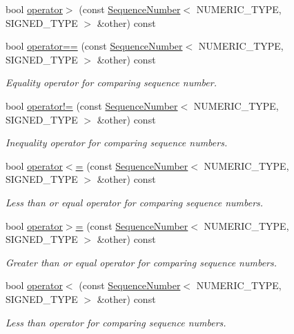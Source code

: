\begin{DoxyCompactItemize}
bool \hyperlink{classns3_1_1SequenceNumber_a455684ef50118fff5c63eba5de502c70}{operator$>$} (const \hyperlink{classns3_1_1SequenceNumber}{Sequence\+Number}$<$ N\+U\+M\+E\+R\+I\+C\+\_\+\+T\+Y\+PE, S\+I\+G\+N\+E\+D\+\_\+\+T\+Y\+PE $>$ \&other) const 
\item 
bool \hyperlink{classns3_1_1SequenceNumber_a73726697e0e122e0dbc0d9f8ede063a0}{operator==} (const \hyperlink{classns3_1_1SequenceNumber}{Sequence\+Number}$<$ N\+U\+M\+E\+R\+I\+C\+\_\+\+T\+Y\+PE, S\+I\+G\+N\+E\+D\+\_\+\+T\+Y\+PE $>$ \&other) const 
\begin{DoxyCompactList}\small\item\em Equality operator for comparing sequence number. \end{DoxyCompactList}\item 
bool \hyperlink{classns3_1_1SequenceNumber_ac2bf889d888a41f585795f9d928c5882}{operator!=} (const \hyperlink{classns3_1_1SequenceNumber}{Sequence\+Number}$<$ N\+U\+M\+E\+R\+I\+C\+\_\+\+T\+Y\+PE, S\+I\+G\+N\+E\+D\+\_\+\+T\+Y\+PE $>$ \&other) const 
\begin{DoxyCompactList}\small\item\em Inequality operator for comparing sequence numbers. \end{DoxyCompactList}\item 
bool \hyperlink{classns3_1_1SequenceNumber_aa71cb1b23fba1301d3ca429cd43a1940}{operator$<$=} (const \hyperlink{classns3_1_1SequenceNumber}{Sequence\+Number}$<$ N\+U\+M\+E\+R\+I\+C\+\_\+\+T\+Y\+PE, S\+I\+G\+N\+E\+D\+\_\+\+T\+Y\+PE $>$ \&other) const 
\begin{DoxyCompactList}\small\item\em Less than or equal operator for comparing sequence numbers. \end{DoxyCompactList}\item 
bool \hyperlink{classns3_1_1SequenceNumber_a1ee35097955e3d79bc9c65aef08d0ecb}{operator$>$=} (const \hyperlink{classns3_1_1SequenceNumber}{Sequence\+Number}$<$ N\+U\+M\+E\+R\+I\+C\+\_\+\+T\+Y\+PE, S\+I\+G\+N\+E\+D\+\_\+\+T\+Y\+PE $>$ \&other) const 
\begin{DoxyCompactList}\small\item\em Greater than or equal operator for comparing sequence numbers. \end{DoxyCompactList}\item 
bool \hyperlink{classns3_1_1SequenceNumber_ae32e37020b48af60c76e87f013ee3fca}{operator$<$} (const \hyperlink{classns3_1_1SequenceNumber}{Sequence\+Number}$<$ N\+U\+M\+E\+R\+I\+C\+\_\+\+T\+Y\+PE, S\+I\+G\+N\+E\+D\+\_\+\+T\+Y\+PE $>$ \&other) const 
\begin{DoxyCompactList}\small\item\em Less than operator for comparing sequence numbers. \end{DoxyCompactList}\end{DoxyCompactItemize}
